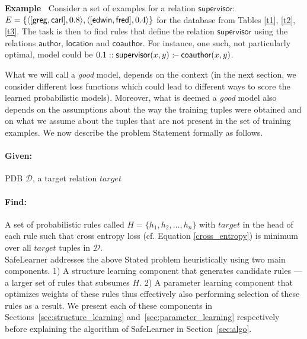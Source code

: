 \documentclass[akbc,twoside,11pt]{article}
\newcounter{example}
\newenvironment{example}[1][]{\refstepcounter{example}\par\medskip\noindent
   \textbf{Example~\theexample #1} \rmfamily}{\medskip}
\newcommand{\ondrej}[1]{\textcolor{red}{O: {#1}}}
\newcommand{\algorithmname}{SafeLearner\xspace}
\begin{document}
\begin{example}
Consider a set of examples for a relation $\mathsf{supervisor}$: $E = \{ \langle [\mathsf{greg}, \mathsf{carl}], 0.8 \rangle,\\ \langle [\mathsf{edwin}, \mathsf{fred}], 0.4 \rangle \}$ for the database from Tables \ref{t1}, \ref{t2}, \ref{t3}. The task is then to find rules that define the relation $\mathsf{supervisor}$ using the relations $\mathsf{author}$, $\mathsf{location}$ and $\mathsf{coauthor}$. For instance, one such, not particularly optimal, model could be $0.1 :: \mathsf{supervisor}(x,y) \mbox{ \textnormal{:--}}\; \mathsf{coauthor}(x,y)$.
\end{example}

What we will call a {\it good} model, depends on the context (in the next section, we consider different loss functions which could lead to different ways to score the learned probabilistic models). Moreover, what is deemed a {\it good} model also depends on the assumptions about the way the training tuples were obtained and on what we assume about the tuples that are not present in the set of training examples. We now describe the problem Statement formally as follows.

\paragraph{Given:} PDB $\mathcal{D}$, a target relation $target$

\paragraph{Find:}
A set of probabilistic rules called $H = \{h_1, h_2, \ldots, h_n\}$ with $target$ in the head of each rule such that cross entropy loss (cf. Equation \ref{cross_entropy}) is minimum over all $target$ tuples in $\mathcal{D}$.\\

\noindent \algorithmname addresses the above Stated problem heuristically using two main components. 1) A structure learning component that generates candidate rules --- a larger set of rules that subsumes $H$. 2) A parameter learning component that optimizes weights of these rules thus effectively also performing selection of these rules as a result. We present each of these components in Sections~\ref{sec:structure_learning} and~\ref{sec:parameter_learning} respectively before explaining the algorithm of \algorithmname in Section~\ref{sec:algo}. 
\end{document}
